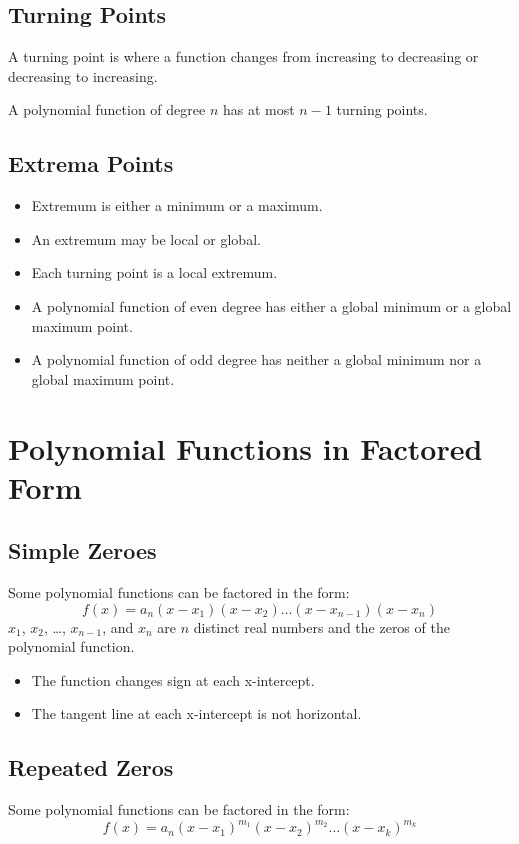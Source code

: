 		\subsection{Turning Points}
			A turning point is where a function changes from increasing to decreasing or decreasing to increasing.
			
			A polynomial function of degree $n$ has at most $n-1$ turning points.
		\subsection{Extrema Points}
			\begin{itemize}
				\item Extremum is either a minimum or a maximum.
				\item An extremum may be local or global.
				\item Each turning point is a local extremum.
				\item A polynomial function of even degree has either a global minimum or a global maximum point.
				\item A polynomial function of odd degree has neither a global minimum nor a global maximum point.
			\end{itemize}
	\section{Polynomial Functions in Factored Form}
		\subsection{Simple Zeroes}
			Some polynomial functions can be factored in the form:
			\[f(x) = a_n(x-x_1)(x-x_2)\dots(x-x_{n-1})(x-x_n)\]
			$x_1$, $x_2$, \dots , $x_{n-1}$, and $x_n$ are $n$ distinct real numbers and the zeros of the polynomial function.

			\begin{itemize}
				\item The function changes sign at each x-intercept.
				\item The tangent line at each x-intercept is not horizontal.
			\end{itemize}
		\subsection{Repeated Zeros}
			Some polynomial functions can be factored in the form:
			\[f(x)=a_n(x-x_1)^{m_1}(x-x_2)^{m_2}\dots(x-x_k)^{m_k}\]

